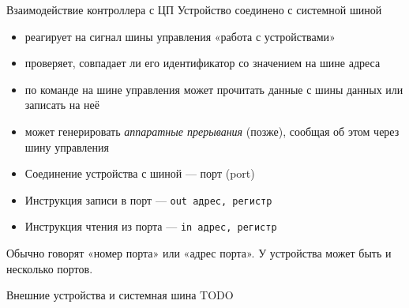 \documentclass[xetex,aspectratio=43]{beamer}
\begin{document}
\begin{frame}[fragile]{Взаимодействие контроллера с ЦП}
		Устройство соединено с системной шиной
		
		\begin{itemize}
			\tightlist
			\item
			реагирует на сигнал шины управления «работа с устройствами»
			\item
			проверяет, совпадает ли его идентификатор со значением на шине адреса
			\item
			по команде на шине управления может прочитать данные с шины данных или записать на неё
			\item
			может генерировать \emph{аппаратные прерывания} (позже), сообщая об этом через шину управления
		\end{itemize}
		
		
		\begin{itemize}
			\tightlist
			\item
			Соединение устройства с шиной --- порт (port)
			\item
			Инструкция записи в порт --- \texttt{out\ адрес,\ регистр}
			\item
			Инструкция чтения из порта --- \texttt{in\ адрес,\ регистр}
		\end{itemize}
		
		
		Обычно говорят «номер порта» или «адрес порта». У устройства может быть
		и несколько портов.
\end{frame}

\begin{frame}{Внешние устройства и системная шина}
	TODO	
\end{frame}
\end{document}
